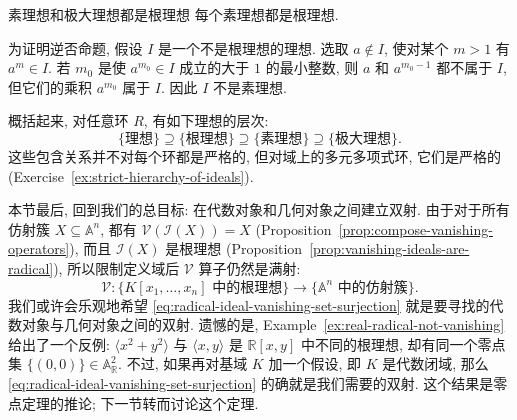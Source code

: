 \begin{Proposition}{素理想和极大理想都是根理想}\leavevmode\label{prop:prime-ideals-are-radical}
  每个素理想都是根理想.
\end{Proposition}

\begin{Proof}
  为证明逆否命题, 假设 $I$ 是一个不是根理想的理想. 选取 $a\notin I$, 使对某个 $m>1$ 有 $a^{m}\in I$. 若 $m_{0}$ 是使 $a^{m_{0}}\in I$ 成立的大于 $1$ 的最小整数, 则 $a$ 和 $a^{m_{0}-1}$ 都不属于 $I$, 但它们的乘积 $a^{m_{0}}$ 属于 $I$. 因此 $I$ 不是素理想.
\end{Proof}

概括起来, 对任意环 $R$, 有如下理想的层次:
\[
  \{\text{理想}\}\supseteq\{\text{根理想}\}\supseteq
  \{\text{素理想}\}\supseteq\{\text{极大理想}\}.
\]
这些包含关系并不对每个环都是严格的, 但对域上的多元多项式环, 它们是严格的 (Exercise~\ref{ex:strict-hierarchy-of-ideals}).

本节最后, 回到我们的总目标: 在代数对象和几何对象之间建立双射. 由于对于所有仿射簇 $X\subseteq\mathbb{A}^{n}$, 都有 $\mathcal{V}(\mathcal{I}(X))=X$ (Proposition~\ref{prop:compose-vanishing-operators}), 而且 $\mathcal{I}(X)$ 是根理想 (Proposition~\ref{prop:vanishing-ideals-are-radical}), 所以限制定义域后 $\mathcal{V}$ 算子仍然是满射:
\begin{equation}\label{eq:radical-ideal-vanishing-set-surjection}
  \mathcal{V}:\{K[x_{1},\ldots,x_{n}]\text{ 中的根理想}\}
   \longrightarrow\{\mathbb{A}^{n}\text{ 中的仿射簇}\}.
\end{equation}
我们或许会乐观地希望 \eqref{eq:radical-ideal-vanishing-set-surjection} 就是要寻找的代数对象与几何对象之间的双射. 遗憾的是, Example~\ref{ex:real-radical-not-vanishing} 给出了一个反例: $\langle x^{2}+y^{2}\rangle$ 与 $\langle x,y\rangle$ 是 $\mathbb{R}[x,y]$ 中不同的根理想, 却有同一个零点集 $\{(0,0)\}\in\mathbb{A}^{2}_{\mathbb{R}}$. 不过, 如果再对基域 $K$ 加一个假设, 即 $K$ 是代数闭域, 那么 \eqref{eq:radical-ideal-vanishing-set-surjection} 的确就是我们需要的双射. 这个结果是零点定理的推论; 下一节转而讨论这个定理.

